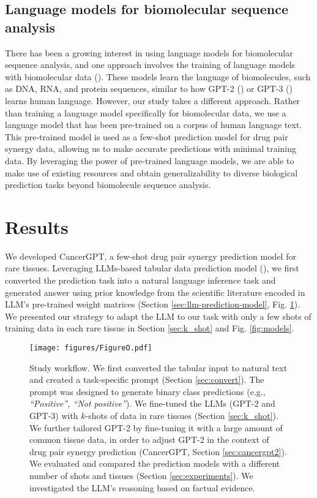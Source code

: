 {\subsection{Language models for biomolecular sequence analysis}
There has been a growing interest in using language models for biomolecular sequence analysis, and one approach involves the training of language models with biomolecular data (\cite{Madani2023-sp, nvidia_bionemo}). These models learn the language of biomolecules, such as DNA, RNA, and protein sequences, similar to how GPT-2 (\cite{radford_language_nodate}) or GPT-3 (\cite{brown_language_2020}) learns human language. However, our study takes a different approach. Rather than training a language model specifically for biomolecular data, we use a  language model that has been pre-trained on a corpus of human language text. This pre-trained model is used as a few-shot prediction model for drug pair synergy data, allowing us to make accurate predictions with minimal training data.  By leveraging the power of pre-trained language models, we are able to make use of existing resources and obtain generalizability to diverse biological prediction tasks beyond biomolecule sequence analysis.  

\section{Results}

We developed CancerGPT, a few-shot drug pair synergy prediction model for rare tissues. Leveraging LLMs-based tabular data prediction model (\cite{hegselmann_tabllm_2023}), we first converted the prediction task into a natural language inference task and generated answer using prior knowledge from the scientific literature encoded in LLM's pre-trained weight matrices (Section \ref{sec:llm-prediction-model}, Fig. \ref{fig:study_workflow}). We presented our strategy to adapt the LLM to our task with only a few shots of training data in each rare tissue in Section \ref{sec:k_shot} and Fig. \ref{fig:models}.

\begin{figure}[t]
  \centering 
  \texttt{[image: figures/FigureO.pdf]}
  \caption{Study workflow. We first converted the tabular input to natural text and created a task-specific prompt (Section \ref{sec:convert}). The prompt was designed to generate binary class predictions (e.g., \emph{``Positive'', ``Not positive''}). We fine-tuned the LLMs (GPT-2 and GPT-3) with $k$-shots of data in rare tissues (Section \ref{sec:k_shot}). We further tailored GPT-2 by fine-tuning it with a large amount of common tissue data, in order to adjust GPT-2 in the context of drug pair synergy prediction (CancerGPT, Section \ref{sec:cancergpt2}). We evaluated and compared the prediction models with a different number of shots and tissues (Section \ref{sec:experiments}). We investigated the LLM's reasoning based on factual evidence.}  
  \label{fig:study_workflow} 
\end{figure}

}
